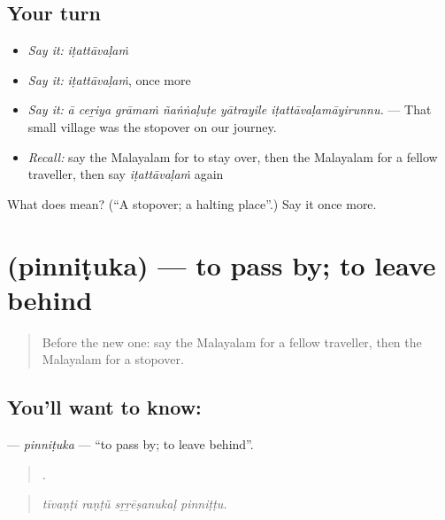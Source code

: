 \subsection*{Your turn}
\begin{itemize}
\raggedright
  \item \emph{Say it:} \emph{iṭattāvaḷaṁ}
  \item \emph{Say it:} \emph{iṭattāvaḷaṁ}, once more
  \item \emph{Say it:} \emph{ā ceṟiya grāmaṁ ñaṅṅaḷuṭe yātrayile iṭattāvaḷamāyirunnu.} — That small village was the stopover on our journey.
  \item \emph{Recall:} say the Malayalam for to stay over, then the Malayalam for a fellow traveller, then say \emph{iṭattāvaḷaṁ} again
\end{itemize}

\begin{tcolorbox}[breakable,colback=teal!4,colframe=teal!35!black,title={Before you move on}]
What does  mean? (\textquotedblleft{}A stopover; a halting place\textquotedblright{}.) Say it once more.
\end{tcolorbox}
\section[\texorpdfstring{\ml{പിന്നിടുക} (pinniṭuka)}{പിന്നിടുക (pinniṭuka)}]{ (pinniṭuka) — to pass by; to leave behind}

\label{lesson:ML-C479-pinnituka}



\begin{quote}
Before the new one: say the Malayalam for a fellow traveller, then the Malayalam for a stopover.
\end{quote}

\subsection*{You'll want to know: }
\textbf{} — \emph{pinniṭuka} — \textquotedblleft{}to pass by; to leave behind\textquotedblright{}.

\begin{quote}
   .
\end{quote}

\begin{quote}
\emph{tīvaṇṭi raṇṭŭ sṟṟēṣanukaḷ pinniṭṭu.}
\end{quote}

